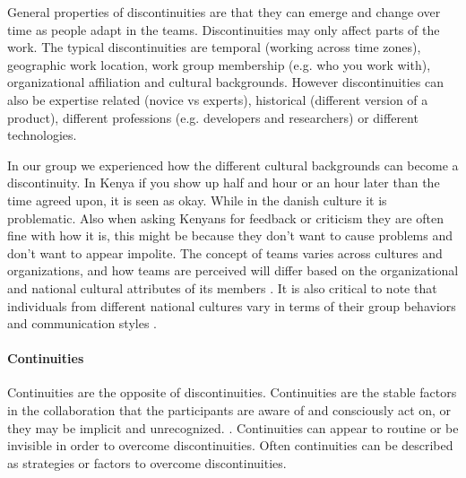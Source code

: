 General properties of discontinuities are that they can emerge and change over time as people adapt in the teams. Discontinuities may only affect parts of the work. The typical discontinuities are temporal (working across time zones), geographic work location, work group membership (e.g. who you work with), organizational affiliation and cultural backgrounds. However discontinuities can also be expertise related (novice vs experts), historical (different version of a product), different professions (e.g. developers and researchers) or different technologies.

In our group we experienced how the different cultural backgrounds can become a discontinuity. In Kenya if you show up half and hour or an hour later than the time agreed upon, it is seen as okay. While in the danish culture it is problematic. Also when asking Kenyans for feedback or criticism they are often fine with how it is, this might be because they don't want to cause problems and don't want to appear impolite. 
The concept of teams varies across cultures and organizations, and how teams are perceived will differ based on the organizational and national cultural attributes of its members \cite{gibson2001metaphors}. It is also critical to note that individuals from different national cultures vary in terms of their group behaviors and communication styles \cite{gudykunst1997cultural}.

\paragraph{Continuities} \label{par:continuities}
Continuities are the opposite of discontinuities. Continuities are the stable factors in the collaboration that the participants are aware of and consciously act on, or they may be implicit and 
unrecognized. \cite{watson2007distance}. Continuities can appear to routine or be invisible in order to overcome discontinuities. Often continuities can be described as strategies or factors to overcome discontinuities.